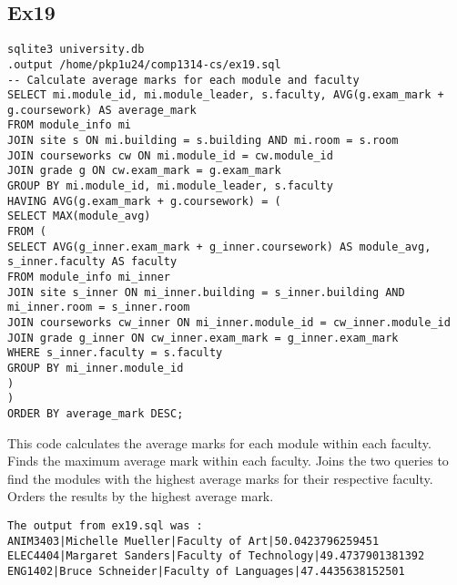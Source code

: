 \documentclass[12pt]{article}
\begin{document}
{{\subsection{Ex19}
\begin{tcolorbox}[
    enhanced,
    attach boxed title to top left={xshift=6mm,yshift=-3mm},
    colback=lightgreen!20,
    colframe=lightgreen,
    colbacktitle=lightgreen,
    title=Linux shell,
    fonttitle=\bfseries\color{black},
    boxed title style={size=small,colframe=lightgreen,sharp corners},
    sharp corners,
]
\begin{verbatim}
sqlite3 university.db 
.output /home/pkp1u24/comp1314-cs/ex19.sql
-- Calculate average marks for each module and faculty
SELECT mi.module_id, mi.module_leader, s.faculty, AVG(g.exam_mark + g.coursework) AS average_mark
FROM module_info mi
JOIN site s ON mi.building = s.building AND mi.room = s.room
JOIN courseworks cw ON mi.module_id = cw.module_id
JOIN grade g ON cw.exam_mark = g.exam_mark
GROUP BY mi.module_id, mi.module_leader, s.faculty
HAVING AVG(g.exam_mark + g.coursework) = (
SELECT MAX(module_avg)
FROM (
SELECT AVG(g_inner.exam_mark + g_inner.coursework) AS module_avg, s_inner.faculty AS faculty
FROM module_info mi_inner
JOIN site s_inner ON mi_inner.building = s_inner.building AND mi_inner.room = s_inner.room
JOIN courseworks cw_inner ON mi_inner.module_id = cw_inner.module_id
JOIN grade g_inner ON cw_inner.exam_mark = g_inner.exam_mark
WHERE s_inner.faculty = s.faculty
GROUP BY mi_inner.module_id
)
)
ORDER BY average_mark DESC;

\end{verbatim}
\end{tcolorbox}

This code calculates the average marks for each module within each faculty. Finds the maximum average mark within each faculty. Joins the two queries to find the modules with the highest average marks for their respective faculty. Orders the results by the highest average mark. \begin{verbatim}
The output from ex19.sql was : 
ANIM3403|Michelle Mueller|Faculty of Art|50.0423796259451
ELEC4404|Margaret Sanders|Faculty of Technology|49.4737901381392
ENG1402|Bruce Schneider|Faculty of Languages|47.4435638152501
\end{verbatim}
}}
\end{document}
